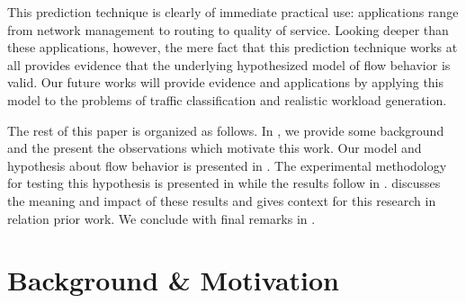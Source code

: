 \documentclass[conference]{IEEEtran}
\begin{document}
This prediction technique is clearly of immediate practical use:
applications range from network management to routing to quality of service.
Looking deeper than these applications, however, the mere fact that this prediction technique works at all provides evidence that the underlying hypothesized model of flow behavior is valid.
Our future works will provide evidence and applications by applying this model to the problems of traffic classification and realistic workload generation.

The rest of this paper is organized as follows.
In , we provide some background and the present the observations which motivate this work.
Our model and hypothesis about flow behavior is presented in .
The experimental methodology for testing this hypothesis is presented in  while the results follow in .
 discusses the meaning and impact of these results and
 gives context for this research in relation prior work.
We conclude with final remarks in .

\section{Background \& Motivation}
\end{document}

